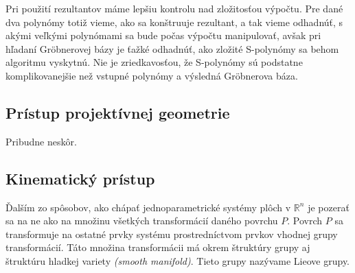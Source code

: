 Pri použití rezultantov máme lepšiu kontrolu nad zložitosťou výpočtu. Pre dané dva polynómy totiž vieme, ako sa konštruuje rezultant, a tak vieme odhadnúť, s akými veľkými polynómami sa bude počas výpočtu manipulovať, avšak pri hľadaní Gröbnerovej bázy je ťažké odhadnúť, ako zložité S-polynómy sa behom algoritmu vyskytnú. Nie je zriedkavosťou, že S-polynómy sú podstatne komplikovanejšie než vstupné polynómy a výsledná Gröbnerova báza.

\subsection{Prístup projektívnej geometrie}
Pribudne neskôr.


\subsection{Kinematický prístup}
Ďalším zo spôsobov, ako chápať jednoparametrické systémy plôch v $\mathbb{R}^n$ je pozerať sa na ne ako na množinu všetkých transformácií daného povrchu $P$. Povrch $P$ sa transformuje na ostatné prvky systému prostredníctvom prvkov vhodnej grupy transformácií. Táto množina transformácii má okrem štruktúry grupy aj štruktúru hladkej variety \textit{(smooth manifold)}. Tieto grupy nazývame Lieove grupy.

